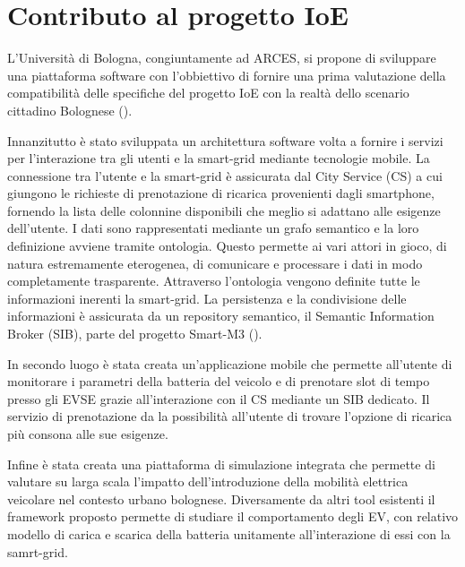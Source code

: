 \section{Contributo al progetto IoE}

L'Università di Bologna, congiuntamente ad ARCES, si propone di sviluppare una piattaforma software con l'obbiettivo di fornire una prima valutazione della compatibilità delle specifiche del progetto IoE con la realtà dello scenario cittadino Bolognese (\cite{bedogni2013interoperable}).

Innanzitutto è stato sviluppata un architettura software volta a fornire i servizi per l'interazione tra gli utenti e la smart-grid mediante tecnologie mobile. La connessione tra l'utente e la smart-grid è assicurata dal City Service (CS) a cui giungono le richieste di prenotazione di ricarica provenienti dagli smartphone, fornendo la lista delle colonnine disponibili che meglio si adattano alle esigenze dell'utente. I dati sono rappresentati mediante un grafo semantico e la loro definizione avviene tramite ontologia. Questo permette ai vari attori in gioco, di natura estremamente eterogenea, di comunicare e processare i dati in modo completamente trasparente. Attraverso l'ontologia vengono definite tutte le informazioni inerenti la smart-grid. La persistenza e la condivisione delle informazioni è assicurata da un repository semantico, il Semantic Information Broker (SIB), parte del progetto Smart-M3 (\cite{smart2013}). 

In secondo luogo è stata creata un'applicazione mobile che permette all'utente di monitorare i parametri della batteria del veicolo e di prenotare slot di tempo presso gli EVSE grazie all'interazione con il CS mediante un SIB dedicato. Il servizio di prenotazione da la possibilità all'utente di trovare l'opzione di ricarica più consona alle sue esigenze.

Infine è stata creata una piattaforma di simulazione integrata che permette di valutare su larga scala
l'impatto dell'introduzione della mobilità elettrica veicolare nel contesto urbano bolognese. Diversamente da altri tool esistenti il framework proposto permette di studiare il comportamento degli EV, con relativo modello di carica e scarica della batteria unitamente all'interazione di essi con la samrt-grid. 






